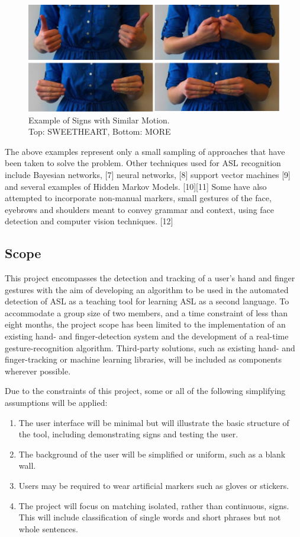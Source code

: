 \documentclass[12pt]{article}
\begin{document}
\begin{figure}[h!]
  \centering
  \includegraphics[scale=1]{MORESWEETHEART.png}
  \caption[Example of Signs with Similar Motion]
  { Example of Signs with Similar Motion.  \\ Top: SWEETHEART, Bottom: MORE  }
  \label{fig:MORE}
\end{figure}

The above examples represent only a small sampling of approaches that have been taken to solve the problem. Other techniques used for ASL recognition include Bayesian networks, [7] neural networks, [8] support vector machines [9] and several examples of Hidden Markov Models. [10][11] Some have also attempted to incorporate non-manual markers, small gestures of the face, eyebrows and shoulders meant to convey grammar and context, using face detection and computer vision techniques. [12]

\subsection{Scope}
This project encompasses the detection and tracking of a user's hand and finger gestures with the aim of developing an algorithm to be used in the automated detection of ASL as a teaching tool for learning ASL as a second language. To accommodate a group size of two members, and a time constraint of less than eight months, the project scope has been limited to the implementation of an existing hand- and finger-detection system and the development of a real-time gesture-recognition algorithm. Third-party solutions, such as existing hand- and finger-tracking or machine learning libraries, will be included as components wherever possible. 

Due to the constraints of this project, some or all of the following simplifying assumptions will be applied:
\begin{enumerate}
  \item The user interface will be minimal but will illustrate the basic structure of the tool, including demonstrating signs and testing the user. 
  \item The background of the user will be simplified or uniform, such as a blank wall. 
  \item Users may be required to wear artificial markers such as gloves or stickers.
  \item The project will focus on matching isolated, rather than continuous, signs. This will include classification of single words and short phrases but not whole sentences. 
\end{enumerate}
\end{document}
